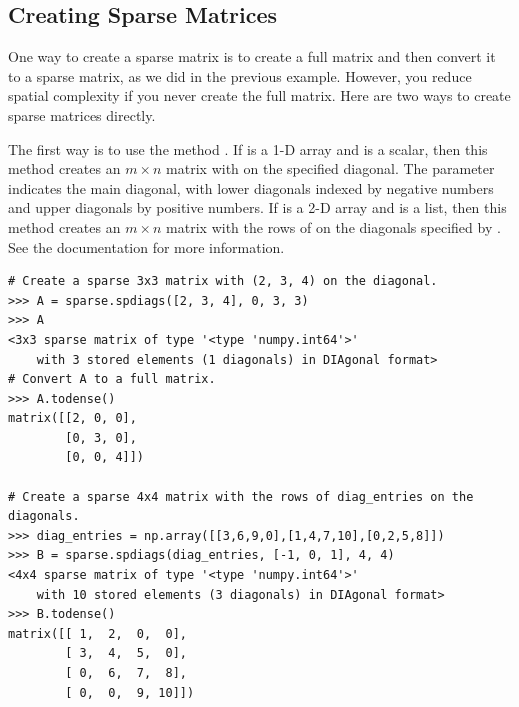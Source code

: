 \subsection*{Creating Sparse Matrices}
One way to create a sparse matrix is to create a full matrix and then convert it to a sparse matrix, as we did in the previous example. 
However, you reduce spatial complexity if you never create the full matrix. 
Here are two ways to create sparse matrices directly.

The first way is to use the method . 
If  is a 1-D array and  is a scalar, then this method creates an $m \times n$ matrix with  on the specified diagonal. 
The parameter  indicates the main diagonal, with lower diagonals indexed by negative numbers and upper diagonals by positive numbers. 
If  is a 2-D array and  is a list, then this method creates an $m \times n$ matrix with the rows of  on the diagonals specified by . 
See the documentation for more information.
\begin{lstlisting}
# Create a sparse 3x3 matrix with (2, 3, 4) on the diagonal.
>>> A = sparse.spdiags([2, 3, 4], 0, 3, 3)
>>> A
<3x3 sparse matrix of type '<type 'numpy.int64'>'
	with 3 stored elements (1 diagonals) in DIAgonal format>
# Convert A to a full matrix.
>>> A.todense()
matrix([[2, 0, 0],
        [0, 3, 0],
        [0, 0, 4]])
	
# Create a sparse 4x4 matrix with the rows of diag_entries on the diagonals.
>>> diag_entries = np.array([[3,6,9,0],[1,4,7,10],[0,2,5,8]])
>>> B = sparse.spdiags(diag_entries, [-1, 0, 1], 4, 4)
<4x4 sparse matrix of type '<type 'numpy.int64'>'
	with 10 stored elements (3 diagonals) in DIAgonal format>
>>> B.todense()
matrix([[ 1,  2,  0,  0],
        [ 3,  4,  5,  0],
        [ 0,  6,  7,  8],
        [ 0,  0,  9, 10]])
\end{lstlisting}

